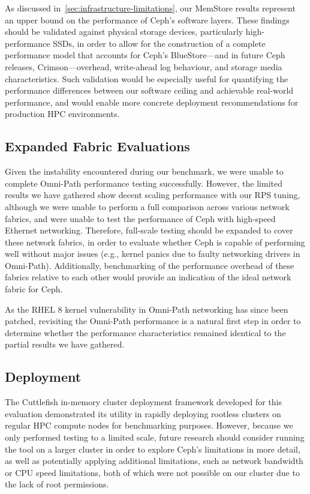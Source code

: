 As discussed in~\cref{sec:infrastructure-limitations}, our MemStore results represent an upper bound on the performance of Ceph's software layers. These findings should be validated against physical storage devices, particularly high-performance \acp{SSD}, in order to allow for the construction of a complete performance model that accounts for Ceph's BlueStore---and in future Ceph releases, Crimson---overhead, write-ahead log behaviour, and storage media characteristics. Such validation would be especially useful for quantifying the performance differences between our software ceiling and achievable real-world performance, and would enable more concrete deployment recommendations for production \ac{HPC} environments.

\subsection{Expanded Fabric Evaluations}

Given the instability encountered during our benchmark, we were unable to complete Omni-Path performance testing successfully. However, the limited results we have gathered show decent scaling performance with our \ac{RPS} tuning, although we were unable to perform a full comparison across various network fabrics, and were unable to test the performance of Ceph with high-speed Ethernet networking. Therefore, full-scale testing should be expanded to cover these network fabrics, in order to evaluate whether Ceph is capable of performing well without major issues (e.g., kernel panics due to faulty networking drivers in Omni-Path). Additionally, benchmarking of the performance overhead of these fabrics relative to each other would provide an indication of the ideal network fabric for Ceph.

As the \ac{RHEL} 8 kernel vulnerability in Omni-Path networking has since been patched, revisiting the Omni-Path performance is a natural first step in order to determine whether the performance characteristics remained identical to the partial results we have gathered.

\subsection{Deployment}

The Cuttlefish in-memory cluster deployment framework developed for this evaluation demonstrated its utility in rapidly deploying rootless clusters on regular \ac{HPC} compute nodes for benchmarking purposes. However, because we only performed testing to a limited scale, future research should consider running the tool on a larger cluster in order to explore Ceph's limitations in more detail, as well as potentially applying additional limitations, such as network bandwidth or \ac{CPU} speed limitations, both of which were not possible on our cluster due to the lack of root permissions.

